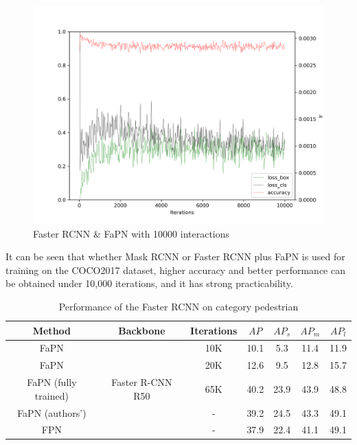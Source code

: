 \begin{figure}[htb]
    \centering
    \includegraphics[width=1\textwidth]{figures/faster_rcnn_r_50_fapn_1x_10000iter.png}
    \caption{Faster RCNN \& FaPN with 10000 interactions}\label{faster_rcnn_r_50_fapn_1x_10000iter}
\end{figure}


It can be seen that whether Mask RCNN \cite{he2017mask} or Faster RCNN plus FaPN is used for training on the COCO2017 dataset, higher accuracy and better performance can be obtained under 10,000 iterations, and it has strong practicability.


\begin{table}[htb]
    \begin{center}
        \caption{Performance of the Faster RCNN on category pedestrian}\label{table1}
        \begin{tabular}{|c|c|c|c|c|c|c|} %
            \toprule
            \textbf{Method} & \textbf{Backbone}&\textbf{Iterations} & $AP$ & $AP_s$ & $AP_m$ & $AP_l$ \\
            \hline
            FaPN          & \multirow{5}{*}{Faster R-CNN R50}&10K &10.1&5.3&11.4&11.9 \\
            FaPN          &  &20K&12.6&9.5&12.8&15.7 \\
			FaPN (fully trained)         & &65K &40.2&23.9&43.9&48.8 \\
			FaPN (authors')         &  &-&39.2&24.5&43.3&49.1 \\
			FPN  & &- &37.9&22.4&41.1&49.1 \\
            \bottomrule
        \end{tabular}
    \end{center}
\end{table}

